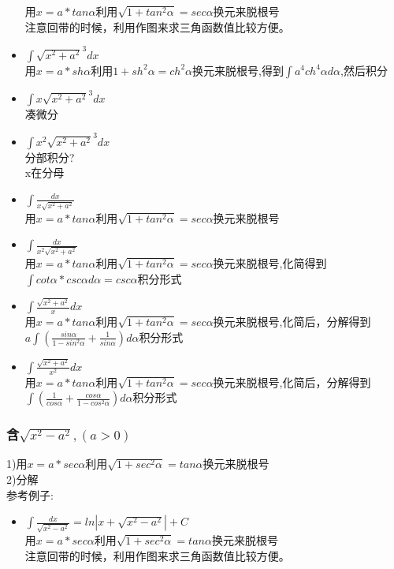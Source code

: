 \documentclass[fleqn]{article}
\begin{document}
\begin{flushleft}
\begin{itemize}
			用$x=a*tan\alpha$利用$\sqrt{1+tan^2\alpha}=sec\alpha$换元来脱根号\\
			注意回带的时候，利用作图来求三角函数值比较方便。\\
			\item $\int \sqrt{x^2+a^2}^3dx$\\
			用$x=a*sh\alpha$利用${1+sh^2 \alpha}=ch^2\alpha$换元来脱根号,得到$\int a^4ch^4\alpha d\alpha$,然后积分\\
			\item $\int x\sqrt{x^2+a^2}^3dx$\\
			凑微分\\
			\item $\int x^2\sqrt{x^2+a^2}^3dx$\\
			分部积分?\\
			x在分母\\
			\item $\int \frac{dx}{x\sqrt{x^2+a^2}}$\\
			用$x=a*tan\alpha$利用$\sqrt{1+tan^2\alpha}=sec\alpha$换元来脱根号\\
			\item $\int \frac{dx}{x^2\sqrt{x^2+a^2}}$\\
			用$x=a*tan\alpha$利用$\sqrt{1+tan^2\alpha}=sec\alpha$换元来脱根号,化简得到$\int cot\alpha*csc\alpha d\alpha=csc\alpha$积分形式\\
		\item $\int \frac{\sqrt{x^2+a^2}}{x}dx$\\
			用$x=a*tan\alpha$利用$\sqrt{1+tan^2\alpha}=sec\alpha$换元来脱根号,化简后，分解得到$a\int (\frac{sin\alpha}{1-sin^2\alpha}+\frac{1}{sin\alpha})d\alpha$积分形式\\
		\item $\int \frac{\sqrt{x^2+a^2}}{x^2}dx$\\
			用$x=a*tan\alpha$利用$\sqrt{1+tan^2\alpha}=sec\alpha$换元来脱根号,化简后，分解得到$\int (\frac{1}{cos\alpha}+\frac{cos\alpha}{1-cos^2\alpha})d\alpha$积分形式\\
		\end{itemize}
		\subsubsection{含$\sqrt{x^2-a^2},(a>0)$}
		1)用$x=a*sec\alpha$利用$\sqrt{1+sec^2\alpha}=tan\alpha$换元来脱根号\\
		2)分解\\
		参考例子:\\
		\begin{itemize}
			\item $\int \frac{dx}{\sqrt{x^2-a^2}}=ln|x+\sqrt{x^2-a^2}|+C$\\
			用$x=a*sec\alpha$利用$\sqrt{1+sec^2\alpha}=tan\alpha$换元来脱根号\\
			注意回带的时候，利用作图来求三角函数值比较方便。\\
		\end{itemize}

\end{flushleft}
\end{document}
